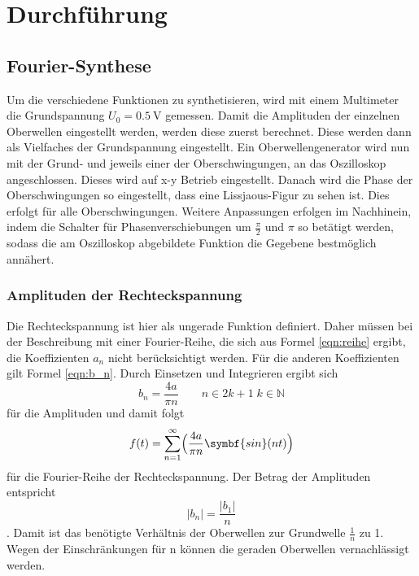 \section{Durchführung}

\subsection{Fourier-Synthese}
Um die verschiedene Funktionen zu synthetisieren, wird mit einem Multimeter die Grundspannung $U_0=\qty{0.5}{\volt}$ gemessen.
Damit die Amplituden der einzelnen Oberwellen eingestellt werden, werden diese zuerst berechnet.
Diese werden dann als Vielfaches der Grundspannung eingestellt.
Ein Oberwellengenerator wird nun mit der Grund- und jeweils einer der Oberschwingungen, an das Oszilloskop angeschlossen.
Dieses wird auf x-y Betrieb eingestellt.
Danach wird die Phase der Oberschwingungen so eingestellt, dass eine Lissjaous-Figur zu sehen ist.
Dies erfolgt für alle Oberschwingungen.
Weitere Anpassungen erfolgen im Nachhinein, indem die Schalter für Phasenverschiebungen um $\frac{\pi}{2}$ und $\pi$ so betätigt werden, sodass die am Oszilloskop abgebildete Funktion die Gegebene bestmöglich annähert.

\label{sec:Durchführung}
\subsubsection{Amplituden der Rechteckspannung}
Die Rechteckspannung ist hier als ungerade Funktion definiert.
Daher müssen bei der Beschreibung mit einer Fourier-Reihe, die sich aus Formel \ref{eqn:reihe} ergibt, die Koeffizienten $a_n$ nicht berücksichtigt werden.
Für die anderen Koeffizienten gilt Formel \ref{eqn:b_n}.
Durch Einsetzen und Integrieren ergibt sich 
\begin{equation}
    b_n=\frac{4a}{\pi n} \qquad n\in2k+1 \; k\in\mathbb{N}
    \label{eqn:amp_recht}
\end{equation}
für die Amplituden und damit folgt
\begin{equation}
    f(t)=\sum_{n=1}^{\infty}\Bigl( \frac{4a}{\pi n} \symbf{sin}(n t)\Bigr) 
    \label{eqn:recht}
\end{equation}
für die Fourier-Reihe der Rechteckspannung.
Der Betrag der Amplituden entspricht
\begin{equation}
    |b_n|=\frac{|b_1|}{n}
    \label{eqn:b_recht}
\end{equation}.
Damit ist das benötigte Verhältnis der Oberwellen zur Grundwelle $\frac{1}{n}$ zu 1.
Wegen der Einschränkungen für n können die geraden Oberwellen vernachlässigt werden.

